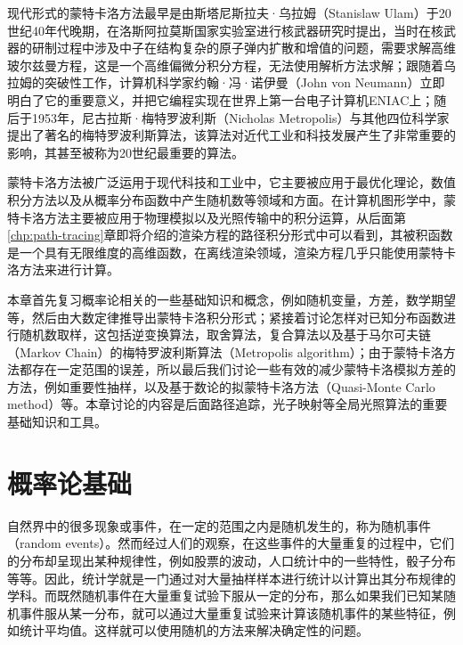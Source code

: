 现代形式的蒙特卡洛方法最早是由斯塔尼斯拉夫·乌拉姆（Stanislaw Ulam）于20世纪40年代晚期，在洛斯阿拉莫斯国家实验室进行核武器研究时提出，当时在核武器的研制过程中涉及中子在结构复杂的原子弹内扩散和增值的问题，需要求解高维玻尔兹曼方程，这是一个高维偏微分积分方程，无法使用解析方法求解；跟随着乌拉姆的突破性工作，计算机科学家约翰·冯·诺伊曼（John von Neumann）立即明白了它的重要意义，并把它编程实现在世界上第一台电子计算机ENIAC上；随后于1953年，尼古拉斯·梅特罗波利斯（Nicholas Metropolis）与其他四位科学家提出了著名的梅特罗波利斯算法\cite{a:EquationofStateCalculationsbyFastComputingMachines}，该算法对近代工业和科技发展产生了非常重要的影响，其甚至被称为20世纪最重要的算法。

蒙特卡洛方法被广泛运用于现代科技和工业中，它主要被应用于最优化理论，数值积分方法以及从概率分布函数中产生随机数等领域和方面。在计算机图形学中，蒙特卡洛方法主要被应用于物理模拟以及光照传输中的积分运算，从后面第\ref{chp:path-tracing}章即将介绍的渲染方程的路径积分形式中可以看到，其被积函数是一个具有无限维度的高维函数，在离线渲染领域，渲染方程几乎只能使用蒙特卡洛方法来进行计算。

本章首先复习概率论相关的一些基础知识和概念，例如随机变量，方差，数学期望等，然后由大数定律推导出蒙特卡洛积分形式；紧接着讨论怎样对已知分布函数进行随机数取样，这包括逆变换算法，取舍算法，复合算法以及基于马尔可夫链（Markov Chain）的梅特罗波利斯算法（Metropolis algorithm）；由于蒙特卡洛方法都存在一定范围的误差，所以最后我们讨论一些有效的减少蒙特卡洛模拟方差的方法，例如重要性抽样，以及基于数论的拟蒙特卡洛方法（Quasi-Monte Carlo method）等。本章讨论的内容是后面路径追踪，光子映射等全局光照算法的重要基础知识和工具。




\section{概率论基础}\label{sec:mc-probability}
自然界中的很多现象或事件，在一定的范围之内是随机发生的，称为随机事件（random events）。然而经过人们的观察，在这些事件的大量重复的过程中，它们的分布却呈现出某种规律性，例如股票的波动，人口统计中的一些特性，骰子分布等等。因此，统计学就是一门通过对大量抽样样本进行统计以计算出其分布规律的学科。而既然随机事件在大量重复试验下服从一定的分布，那么如果我们已知某随机事件服从某一分布，就可以通过大量重复试验来计算该随机事件的某些特征，例如统计平均值。这样就可以使用随机的方法来解决确定性的问题。



